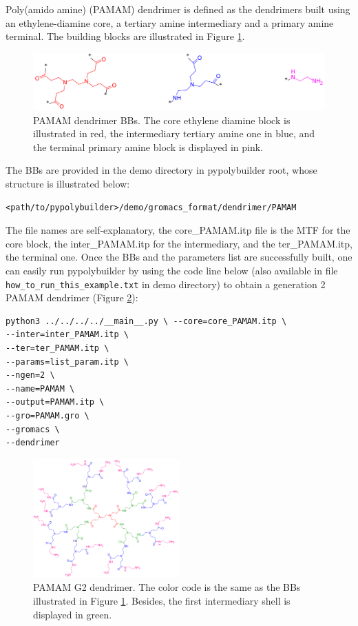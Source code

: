 
Poly(amido amine) (PAMAM) dendrimer is defined as the dendrimers built using an ethylene-diamine core, a tertiary amine intermediary and a primary amine terminal.
The building blocks are illustrated in Figure \ref{fig:PAMAMBB}.

\begin{figure}
    \centering
    \includegraphics[width=\textwidth]{PAMAM/PAMAMBBs.png}
    \caption{PAMAM dendrimer BBs.
             The core ethylene diamine block is illustrated in red, the intermediary tertiary amine one in blue, and the terminal primary amine block is displayed in pink.}
    \label{fig:PAMAMBB}
\end{figure}

The BBs are provided in the demo directory in pypolybuilder root, whose structure is illustrated below:
\begin{lstlisting}
<path/to/pypolybuilder>/demo/gromacs_format/dendrimer/PAMAM
\end{lstlisting}

The file names are self-explanatory, the core\_PAMAM.itp file is the MTF for the core block, the inter\_PAMAM.itp for the intermediary, and the ter\_PAMAM.itp, the terminal one.
Once the BBs and the parameters list are successfully built, one can easily run pypolybuilder by using the code line below (also available in file \texttt{how\_to\_run\_this\_example.txt} in demo directory) to obtain a generation 2 PAMAM dendrimer (Figure \ref{fig:PAMAMG2}):

\begin{lstlisting}
python3 ../../../../__main__.py \ --core=core_PAMAM.itp \
--inter=inter_PAMAM.itp \
--ter=ter_PAMAM.itp \
--params=list_param.itp \
--ngen=2 \
--name=PAMAM \
--output=PAMAM.itp \
--gro=PAMAM.gro \
--gromacs \
--dendrimer
\end{lstlisting}

\begin{figure}
    \centering
    \includegraphics[width=0.5\textwidth]{PAMAM/PAMAMG2.png}
    \caption{PAMAM G2 dendrimer. The color code is the same as the BBs illustrated in Figure \ref{fig:PAMAMBB}. Besides, the first intermediary shell is displayed in green.}
    \label{fig:PAMAMG2}
\end{figure}

